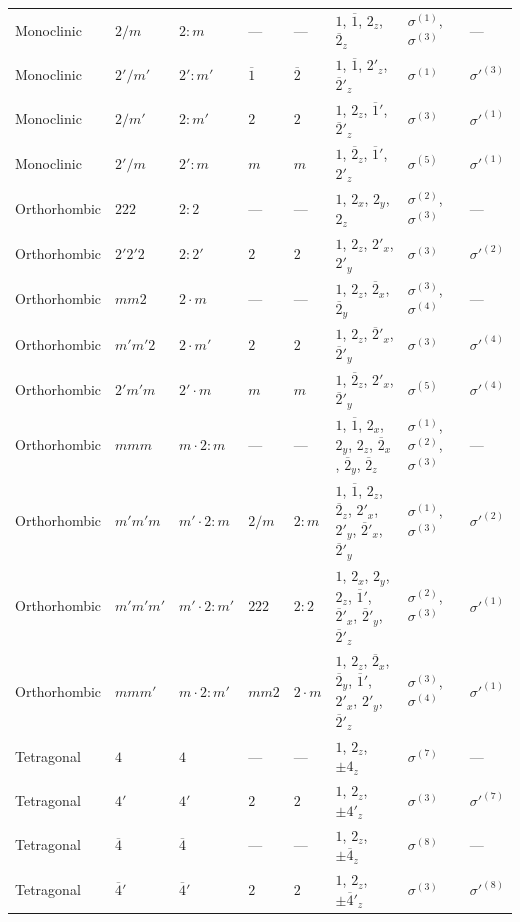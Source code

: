 \documentclass[a4paper,11pt]{article}
\newcommand{\ob}[1]{\overline{#1}}
\newcommand{\sg}[1]{\sigma^{(#1)}}
\newcommand{\sgp}[1]{\sigma'^{(#1)}}
\begin{document}
\begin{landscape}
\begin{longtable}{l l l l l p{9.5cm} l l}
Monoclinic & $2/m$ & $2{:}m$ & --- & --- & $1$, $\ob{1}$, $2_z$, $\ob{2}_z$ & $\sg{1}$, $\sg{3}$ & --- \\
Monoclinic & $2'/m'$ & $2'{:}m'$ & $\ob{1}$ & $\ob{2}$ & $1$, $\ob{1}$, $2'_z$, $\ob{2}'_z$ & $\sg{1}$ & $\sgp{3}$ \\
Monoclinic & $2/m'$ & $2{:}m'$ & $2$ & $2$ & $1$, $2_z$, $\ob{1}'$, $\ob{2}'_z$ & $\sg{3}$ & $\sgp{1}$ \\
Monoclinic & $2'/m$ & $2'{:}m$ & $m$ & $m$ & $1$, $\ob{2}_z$, $\ob{1}'$, $2'_z$ & $\sg{5}$ & $\sgp{1}$ \\
\addlinespace
Orthorhombic & $222$ & $2{:}2$ & --- & --- & $1$, $2_x$, $2_y$, $2_z$ & $\sg{2}$, $\sg{3}$ & --- \\
Orthorhombic & $2'2'2$ & $2{:}2'$ & $2$ & $2$ & $1$, $2_z$, $2'_x$, $2'_y$ & $\sg{3}$ & $\sgp{2}$ \\
Orthorhombic & $mm2$ & $2{\cdot}m$ & --- & --- & $1$, $2_z$, $\ob{2}_x$, $\ob{2}_y$ & $\sg{3}$, $\sg{4}$ & --- \\
Orthorhombic & $m'm'2$ & $2{\cdot}m'$ & $2$ & $2$ & $1$, $2_z$, $\ob{2}'_x$, $\ob{2}'_y$ & $\sg{3}$ & $\sgp{4}$ \\
Orthorhombic & $2'm'm$ & $2'{\cdot}m$ & $m$ & $m$ & $1$, $\ob{2}_z$, $2'_x$, $\ob{2}'_y$ & $\sg{5}$ & $\sgp{4}$ \\
Orthorhombic & $mmm$ & $m{\cdot}2{:}m$ & --- & --- & $1$, $\ob{1}$, $2_x$, $2_y$, $2_z$, $\ob{2}_x$, $\ob{2}_y$, $\ob{2}_z$ & $\sg{1}$, $\sg{2}$, $\sg{3}$ & --- \\
Orthorhombic & $m'm'm$ & $m'{\cdot}2{:}m$ & $2/m$ & $2{:}m$ & $1$, $\ob{1}$, $2_z$, $\ob{2}_z$, $2'_x$, $2'_y$, $\ob{2}'_x$, $\ob{2}'_y$ & $\sg{1}$, $\sg{3}$ & $\sgp{2}$ \\
Orthorhombic & $m'm'm'$ & $m'{\cdot}2{:}m'$ & $222$ & $2{:}2$ & $1$, $2_x$, $2_y$, $2_z$, $\ob{1}'$, $\ob{2}'_x$, $\ob{2}'_y$, $\ob{2}'_z$ & $\sg{2}$, $\sg{3}$ & $\sgp{1}$ \\
Orthorhombic & $mmm'$ & $m{\cdot}2{:}m'$ & $mm2$ & $2{\cdot}m$ & $1$, $2_z$, $\ob{2}_x$, $\ob{2}_y$, $\ob{1}'$, $2'_x$, $2'_y$, $\ob{2}'_z$ & $\sg{3}$, $\sg{4}$ & $\sgp{1}$ \\
\addlinespace
Tetragonal & $4$ & $4$ & --- & --- & $1$, $2_z$, $\pm 4_z$ & $\sg{7}$ & --- \\
Tetragonal & $4'$ & $4'$ & $2$ & $2$ & $1$, $2_z$, $\pm 4'_z$ & $\sg{3}$ & $\sgp{7}$ \\
Tetragonal & $\ob{4}$ & $\ob{4}$ & --- & --- & $1$, $2_z$, $\pm\ob{4}_z$ & $\sg{8}$ & --- \\
Tetragonal & $\ob{4}'$ & $\ob{4}'$ & $2$ & $2$ & $1$, $2_z$, $\pm\ob{4}'_z$ & $\sg{3}$ & $\sgp{8}$ \\

\end{longtable}
\end{landscape}
\end{document}
